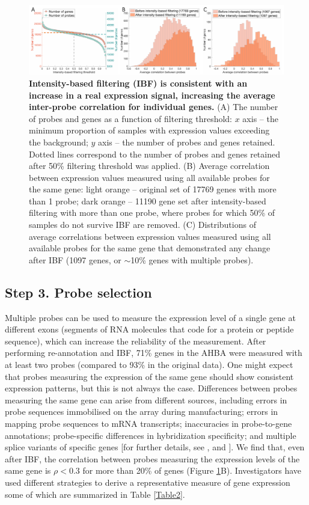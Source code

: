 \begin{figure}[h!]
  \centering
    \includegraphics[width=1\textwidth]{Chapter4/Ch4Fig3.pdf}
\caption{\textbf{Intensity-based filtering (IBF) is consistent with an increase in a real expression signal, increasing the average inter-probe correlation for individual genes.} (A) The number of probes and genes as a function of filtering threshold: $x$ axis – the minimum proportion of samples with expression values exceeding the background; $y$ axis – the number of probes and genes retained. Dotted lines correspond to the number of probes and genes retained after 50\% filtering threshold was applied.
(B) Average correlation between expression values measured using all available probes for the same gene: light orange -- original set of \num{17769} genes with more than 1 probe; dark orange – \num{11190} gene set after intensity-based filtering with more than one probe, where probes for which 50\% of samples do not survive IBF are removed.
(C) Distributions of average correlations between expression values measured using all available probes for the same gene that demonstrated any change after IBF (1097 genes, or $\sim$10\% genes with multiple probes). }

\label{fig:Ch4Fig3}
\end{figure}

\subsection{Step 3. Probe selection}

Multiple probes can be used to measure the expression level of a single gene at different exons (segments of RNA molecules that code for a protein or peptide sequence), which can increase the reliability of the measurement. After performing re-annotation and IBF, 71\% genes in the AHBA were measured with at least two probes (compared to 93\% in the original data). One might expect that probes measuring the expression of the same gene should show consistent expression patterns, but this is not always the case. Differences between probes measuring the same gene can arise from different sources, including errors in probe sequences immobilised on the array during manufacturing; errors in mapping probe sequences to mRNA transcripts; inaccuracies in probe-to-gene annotations; probe-specific differences in hybridization specificity; and multiple splice variants of specific genes [for further details, see \citet{Liu2010}, and \citep{Jaksik2015}]. We find that, even after IBF, the correlation between probes measuring the expression levels of the same gene is $\rho < 0.3$ for more than 20\% of genes (Figure \ref{fig:Ch4Fig3}B). Investigators have used different strategies to derive a representative measure of gene expression some of which are summarized in Table \ref{Table2}.

